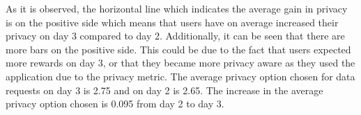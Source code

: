 As it is observed, the horizontal line which indicates the average gain in privacy is on the positive side which means that users have on average increased their privacy on day 3 compared to day 2. Additionally, it can be seen that there are more bars on the positive side. This could be due to the fact that users expected more rewards on day 3, or that they became more privacy aware as they used the application due to the privacy metric. The average privacy option chosen for data requests on day 3 is 2.75 and on day 2 is 2.65. The increase in the average privacy option chosen is 0.095 from day 2 to day 3.

%
%
